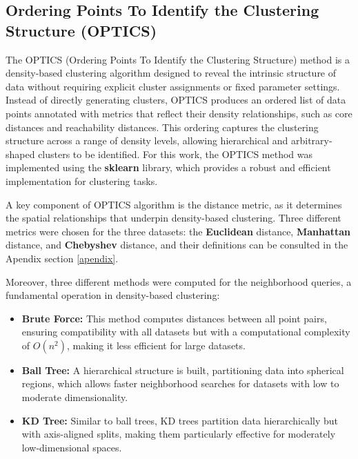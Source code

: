 \subsection{Ordering Points To Identify the Clustering Structure (OPTICS)}

The OPTICS (Ordering Points To Identify the Clustering Structure) method is a density-based clustering algorithm designed
to reveal the intrinsic structure of data without requiring explicit cluster assignments or fixed parameter settings.
Instead of directly generating clusters, OPTICS produces an ordered list of data points annotated with metrics that
reflect their density relationships, such as core distances and reachability distances. This ordering captures the
clustering structure across a range of density levels, allowing hierarchical and arbitrary-shaped clusters to be identified.
For this work, the OPTICS method was implemented using the \textbf{sklearn} library, which provides a robust and efficient implementation for clustering tasks.

A key component of OPTICS algorithm is the distance metric, as it determines the spatial relationships that underpin density-based
 clustering. Three different metrics were chosen for the three datasets: the \textbf{Euclidean} distance, \textbf{Manhattan}
  distance, and \textbf{Chebyshev} distance, and their definitions can be consulted in the Apendix section \ref{apendix}.

Moreover, three different methods were computed for the neighborhood queries, a fundamental operation in density-based
clustering:
\begin{itemize}
    \item \textbf{Brute Force:} This method computes distances between all point pairs, ensuring compatibility with all
    datasets but with a computational complexity of $O(n^2)$, making it less efficient for large datasets.
    \item \textbf{Ball Tree:} A hierarchical structure is built, partitioning data into spherical regions, which allows
    faster neighborhood searches for datasets with low to moderate dimensionality.
    \item \textbf{KD Tree:} Similar to ball trees, KD trees partition data hierarchically but with axis-aligned splits,
    making them particularly effective for moderately low-dimensional spaces.
\end{itemize}

